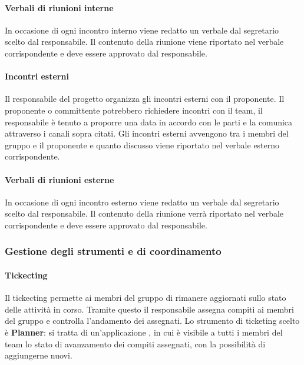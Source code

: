 \paragraph{Verbali di riunioni interne} 
In occasione di ogni incontro interno viene redatto un verbale dal segretario scelto dal responsabile. Il contenuto della riunione viene riportato nel verbale corrispondente e deve essere approvato dal responsabile.

\paragraph{Incontri esterni} 
Il responsabile del progetto organizza gli incontri esterni con il proponente. Il proponente o committente potrebbero richiedere incontri con il team, il responsabile è tenuto a proporre una data in accordo con le parti e la comunica attraverso i canali sopra citati.
Gli incontri esterni avvengono tra i membri del gruppo e il proponente e quanto discusso viene riportato nel verbale esterno corrispondente.

\paragraph{Verbali di riunioni esterne} 
In occasione di ogni incontro esterno viene redatto un verbale dal segretario scelto dal responsabile. Il contenuto della riunione verrà riportato nel verbale corrispondente e deve essere approvato dal responsabile.

\subsubsection{Gestione degli strumenti e di coordinamento}
\paragraph{Tickecting}

Il tickecting permette ai membri del gruppo di rimanere aggiornati sullo stato delle attività in corso. Tramite questo il responsabile assegna compiti ai membri del gruppo e controlla l'andamento dei  assegnati. Lo strumento di ticketing scelto è \textbf{Planner}: si tratta di un'applicazione , in cui è visibile a tutti i membri del team lo stato di avanzamento dei compiti assegnati, con la possibilità di aggiungerne nuovi. 

